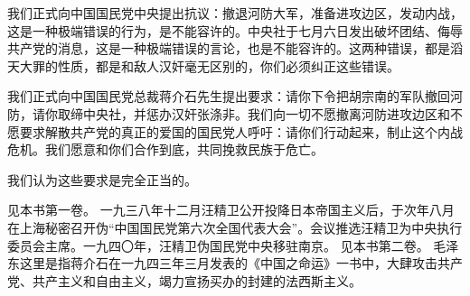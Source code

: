 我们正式向中国国民党中央提出抗议：撤退河防大军，准备进攻边区，发动内战，这是一种极端错误的行为，是不能容许的。中央社于七月六日发出破坏团结、侮辱共产党的消息，这是一种极端错误的言论，也是不能容许的。这两种错误，都是滔天大罪的性质，都是和敌人汉奸毫无区别的，你们必须纠正这些错误。

我们正式向中国国民党总裁蒋介石先生提出要求：请你下令把胡宗南的军队撤回河防，请你取缔中央社，并惩办汉奸张涤非。我们向一切不愿撤离河防进攻边区和不愿要求解散共产党的真正的爱国的国民党人呼吁：请你们行动起来，制止这个内战危机。我们愿意和你们合作到底，共同挽救民族于危亡。

我们认为这些要求是完全正当的。


\begin{maonote}
见本书第一卷。
一九三八年十二月汪精卫公开投降日本帝国主义后，于次年八月在上海秘密召开伪“中国国民党第六次全国代表大会”。会议推选汪精卫为中央执行委员会主席。一九四〇年，汪精卫伪国民党中央移驻南京。
见本书第二卷。
毛泽东这里是指蒋介石在一九四三年三月发表的《中国之命运》一书中，大肆攻击共产党、共产主义和自由主义，竭力宣扬买办的封建的法西斯主义。
\end{maonote}
